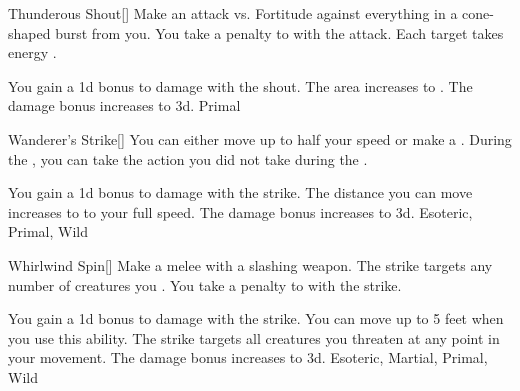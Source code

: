 \lowercase{\hypertarget{maneuver:Thunderous Shout}{}}\label{maneuver:Thunderous Shout}
\hypertarget{maneuver:Thunderous Shout}{}
\begin{freeability}{Thunderous Shout}[]
Make an attack vs. Fortitude against everything in a \areamed cone-shaped burst from you.
You take a  penalty to  with the attack.
\hit Each target takes energy .

\rankline
{} You gain a \plus1d bonus to damage with the shout.
 The area increases to \arealarge.
 The damage bonus increases to \plus3d.
 Primal
\end{freeability}
\vspace{0.25em}



\lowercase{\hypertarget{maneuver:Wanderer's Strike}{}}\label{maneuver:Wanderer's Strike}
\hypertarget{maneuver:Wanderer's Strike}{}
\begin{freeability}{Wanderer's Strike}[]
You can either move up to half your speed or make a .
During the , you can take the action you did not take during the .

\rankline
{} You gain a \plus1d bonus to damage with the strike.
 The distance you can move increases to to your full speed.
 The damage bonus increases to \plus3d.
 Esoteric, Primal, Wild
\end{freeability}
\vspace{0.25em}



\lowercase{\hypertarget{maneuver:Whirlwind Spin}{}}\label{maneuver:Whirlwind Spin}
\hypertarget{maneuver:Whirlwind Spin}{}
\begin{freeability}{Whirlwind Spin}[]
Make a melee  with a slashing weapon.
The strike targets any number of creatures you .
You take a  penalty to  with the strike.

\rankline
{} You gain a \plus1d bonus to damage with the strike.
 You can move up to 5 feet when you use this ability.
The strike targets all creatures you threaten at any point in your movement.
 The damage bonus increases to \plus3d.
 Esoteric, Martial, Primal, Wild
\end{freeability}
\vspace{0.25em}

